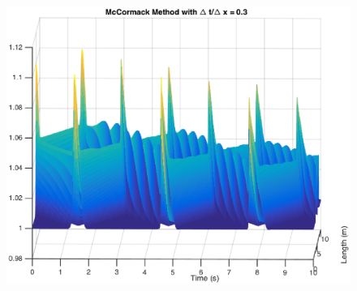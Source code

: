 \begin{figure}
\begin{center}
\includegraphics[scale=0.6]{mccormack03side.eps}
\label{reg}
\end{center}
\end{figure}
